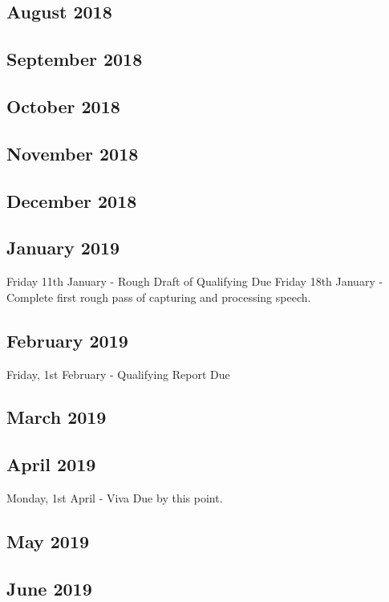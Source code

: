 \documentclass{article}
\begin{document}
	\subsection{August 2018}
	
	\subsection{September 2018}
	
	\subsection{October 2018}
	
	\subsection{November 2018}
	
	\subsection{December 2018}	
	
	\subsection{January 2019}
	Friday 11th January - Rough Draft of Qualifying Due
	Friday 18th January - Complete first rough pass of capturing and processing speech.
	
	\subsection{February 2019}
	Friday, 1st February - Qualifying Report Due
	
	\subsection{March 2019}
	
	\subsection{April 2019}
	Monday, 1st April - Viva Due by this point.
	\subsection{May 2019}
	
	\subsection{June 2019}
	
\end{document}
